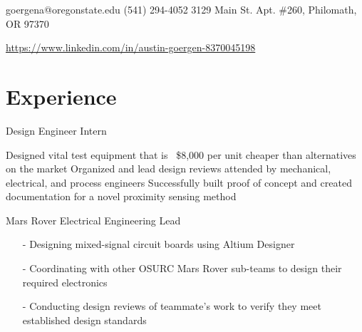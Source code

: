 \documentclass{my_cv}
\begin{document}

\contact
{goergena@oregonstate.edu}
{(541) 294-4052}
{3129 Main St. Apt. \#260, Philomath, OR 97370}

\vspace{-0.5em}

\begin{center}
\href{https://www.linkedin.com/in/austin-goergen-8370045198}{https://www.linkedin.com/in/austin-goergen-8370045198}
\end{center}

\section{Experience}

\vspace{-0.75em}
Design Engineer Intern

\workitems
{Designed vital test equipment that is ~\$8,000 per unit cheaper than alternatives on the market}
{Organized and lead design reviews attended by mechanical, electrical, and process engineers}
{Successfully built proof of concept and created documentation for a novel proximity sensing method}

\vspace{-0.75em}
Mars Rover Electrical Engineering Lead

\vspace{-0.5em}
\begin{itemize}
    \item[-] Designing mixed-signal circuit boards using Altium Designer
    \vspace{-0.75em}
    
    \item[-] Coordinating with other OSURC Mars Rover sub-teams to design their required electronics
    \vspace{-0.75em}
    
    \item[-] Conducting design reviews of teammate's work to verify they meet established design standards
    \vspace{-0.75em}
\end{itemize}
\end{document}

